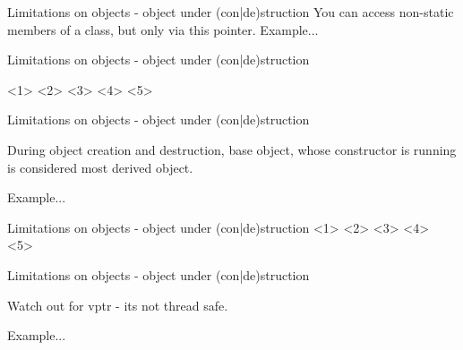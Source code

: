 \documentclass{panicsoftware-presentation}
\begin{document}
\begin{frame}{Limitations on objects - object under (con|de)struction}
You \alert{can access non-static members of a class}, but only via \alert{this} pointer.
\vfill
Example...
\end{frame}

\begin{frame}{Limitations on objects - object under (con|de)struction}

<1>
<2>
<3>
<4>
<5>

\end{frame}

\begin{frame}{Limitations on objects - object under (con|de)struction}
\begin{center}
During object creation and destruction, \alert{base object, whose constructor is running is considered most derived object}.
\end{center}
\vfill
Example...
\end{frame}

\begin{frame}{Limitations on objects - object under (con|de)struction}
<1>
<2>
<3>
<4>
<5>

\end{frame}

\begin{frame}{Limitations on objects - object under (con|de)struction}

\centerline{Watch out for \alert{vptr - its not thread safe}.}
\vfill
Example...

\end{frame}
\end{document}
